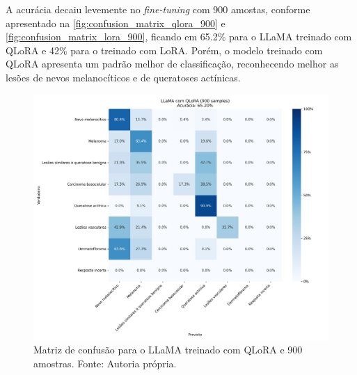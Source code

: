 A acurácia decaiu levemente no \textit{fine-tuning} com 900 amostas, conforme apresentado na \autoref{fig:confusion_matrix_qlora_900} e
\autoref{fig:confusion_matrix_lora_900}, ficando em 65.2\% para o \ac{LLaMA} treinado com \ac{QLoRA} e 42\% para o treinado com \ac{LoRA}. Porém, o modelo treinado com
\ac{QLoRA} apresenta um padrão melhor de classificação, reconhecendo melhor as lesões de nevos melanocíticos e de queratoses actínicas.

\clearpage

\begin{figure}[ht]
    \centering
    \includegraphics[width=1\columnwidth,keepaspectratio]{images/confusion_matrix_qlora_900.png}
    \caption{\small Matriz de confusão para o \ac{LLaMA} treinado com \ac{QLoRA} e 900 amostras. Fonte: Autoria
        própria.}
    \label{fig:confusion_matrix_qlora_900}
\end{figure}

\clearpage

